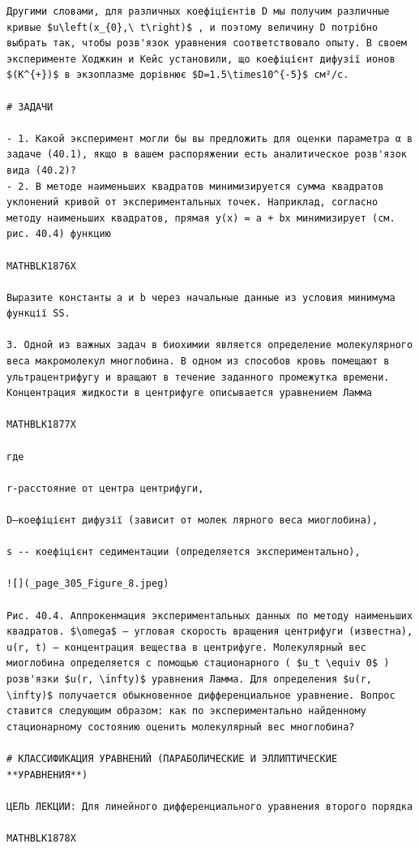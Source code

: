 \documentclass[
  ukrainian,
]{article}
\begin{document}
\begin{verbatim}
Другими словами, для различных коефіцієнтів D мы получим различные кривые $u\left(x_{0},\ t\right)$ , и поэтому величину D потрібно выбрать так, чтобы розв'язок уравнения соответствовало опыту. В своем эксперименте Ходжкин и Кейс установили, що коефіцієнт дифузії ионов $(K^{+})$ в экзоплазме дорівнює $D=1.5\times10^{-5}$ см²/с.

# ЗАДАЧИ

- 1. Какой эксперимент могли бы вы предложить для оценки параметра α в задаче (40.1), якщо в вашем распоряжении есть аналитическое розв'язок вида (40.2)?
- 2. В методе наименьших квадратов минимизируется сумма квадратов уклонений кривой от экспериментальных точек. Наприклад, согласно методу наименьших квадратов, прямая y(x) = a + bx минимизирует (см. рис. 40.4) функцию

MATHBLK1876X

Выразите константы a и b через начальные данные из условия минимума функції SS.

3. Одной из важных задач в биохимии является определение молекулярного веса макромолекул многлобина. В одном из способов кровь помещают в ультрацентрифугу и вращают в течение заданного промежутка времени. Концентрация жидкости в центрифуге описывается уравнением Ламма

MATHBLK1877X

где

r-расстояние от центра центрифуги,

D—коефіцієнт дифузії (зависит от молек лярного веса миоглобина),

s -- коефіцієнт седиментации (определяется экспериментально),

![](_page_305_Figure_8.jpeg)

Рис. 40.4. Аппрокенмация экспериментальных данных по методу наименьших квадратов. $\omega$ — угловая скорость вращения центрифуги (известна), u(r, t) — концентрация вещества в центрифуге. Молекулярный вес миоглобина определяется с помощью стационарного ( $u_t \equiv 0$ ) розв'язки $u(r, \infty)$ уравнения Ламма. Для определения $u(r, \infty)$ получается обыкновенное дифференциальное уравнение. Вопрос ставится следующим образом: как по экспериментально найденному стационарному состоянию оценить молекулярный вес многлобина?

# КЛАССИФИКАЦИЯ УРАВНЕНИЙ (ПАРАБОЛИЧЕСКИЕ И ЭЛЛИПТИЧЕСКИЕ **УРАВНЕНИЯ**)

ЦЕЛЬ ЛЕКЦИИ: Для линейного дифференциального уравнения второго порядка

MATHBLK1878X


\end{verbatim}
\end{document}
